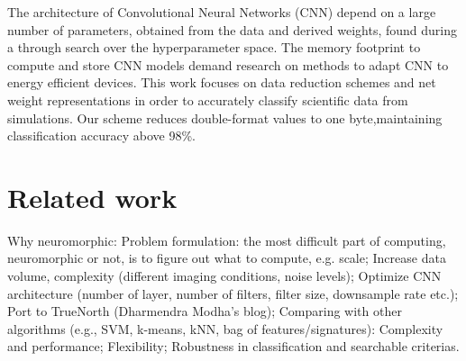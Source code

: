 The architecture of Convolutional Neural Networks (CNN) depend on a
large number of parameters, obtained from the data and derived weights,
found during a through search over the hyperparameter space. The
memory footprint to compute and store CNN models demand research
on methods to adapt CNN to energy efficient devices. This work focuses
on data reduction schemes and net weight representations in order to
accurately classify scientific data from simulations. Our scheme reduces
double-format values to one byte,maintaining classification accuracy
above 98\%.



\section{Related work}
Why neuromorphic:
Problem formulation: the most difficult part of computing, neuromorphic or not, is to figure out what to compute, e.g. scale;
Increase data volume, complexity (different imaging conditions, noise levels);
Optimize CNN architecture (number of layer, number of filters, filter size, downsample rate etc.);
Port to TrueNorth (Dharmendra Modha’s blog);
Comparing with other algorithms (e.g., SVM, k-means, kNN, bag of features/signatures):
Complexity and performance;
Flexibility;
Robustness in classification and searchable criterias.
